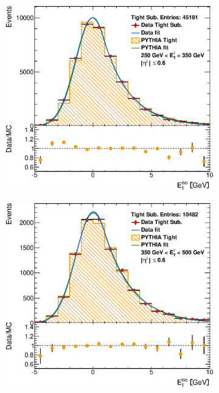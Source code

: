 \documentclass[12pt, twoside]{article}
\numberwithin{equation}{section}
\numberwithin{figure}{section}
\newenvironment{changemargin}[2]{%
\begin{list}{}{%
\setlength{\topsep}{0pt}%
\setlength{\leftmargin}{#1}%
\setlength{\rightmargin}{#2}%
\setlength{\listparindent}{\parindent}%
\setlength{\itemindent}{\parindent}%
\setlength{\parsep}{\parskip}%
}%
\item[]}{\end{list}}
\begin{document}
\begin{figure}[H]
\begin{changemargin}{-1.0cm}{-0.75cm}
\begin{changemargin}{-0.75cm}{-1.0cm}
\begin{subfigure}[b]{0.27\textwidth}
        \end{subfigure}
        \begin{subfigure}[b]{0.27\textwidth}
            \includegraphics[width=\textwidth]{./images/EtISOCorrection/T_MC_FITS-13(10GeV)(After).eps}
        \end{subfigure}
        \begin{subfigure}[b]{0.27\textwidth}
            \includegraphics[width=\textwidth]{./images/EtISOCorrection/T_MC_FITS-14(10GeV)(After).eps}
        \end{subfigure}


\end{changemargin}
\end{changemargin}
\end{figure}
\end{document}
